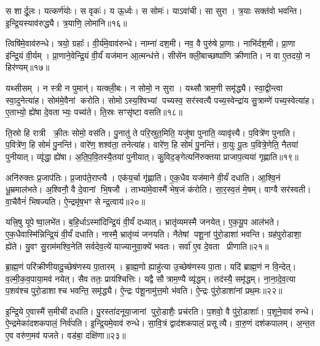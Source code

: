 स शार्दू॒लः।
यत्कर्ण॑योः।
स वृकः॑।
य ऊ॒र्ध्वः।
स सोमः॑।
याऽवा॑ची।
सा सुरा।
त्र॒याः सक्त॑वो भवन्ति।
इ॒न्द्रि॒यस्याव॑रुद्ध्यै।
त्र॒याणि॒ लोमा॑नि॥१६॥

त्विषि॑मे॒वाव॑रुन्धे।
त्रयो॒ ग्रहाः᳚।
वी॒र्य॑मे॒वाव॑रुन्धे।
नाम्ना॑ दश॒मी।
नव॒ वै पुरु॑षे प्रा॒णाः।
नाभि॑र्दश॒मी।
प्रा॒णा इ॑न्द्रि॒यं वी॒र्यम्।
प्रा॒णाने॒वेन्द्रि॒यं वी॒र्यं॑ यज॑मान आ॒त्मन्ध॑त्ते।
सीसे॑न क्ली॒बाच्छष्पा॑णि क्रीणाति।
न वा ए॒तदयो॒ न हिर॑ण्यम्॥१७॥

यथ्सीसम्।
न स्त्री न पुमान्॑।
यत्क्ली॒बः।
न सोमो॒ न सुरा।
यथ्सौत्राम॒णी समृ॑द्ध्यै।
स्वा॒द्वीन्त्वा स्वा॒दुनेत्या॑ह।
सोम॑मे॒वैनां करोति।
सोमो\-ऽस्य॒श्विभ्यां पच्यस्व॒ सर॑स्वत्यै पच्य॒स्वेन्द्रा॑य सु॒त्राम्णे॑ पच्य॒स्वेत्या॑ह।
ए॒ताभ्यो॒ ह्ये॑षा दे॒वताभ्यः॒ पच्य॑ते।
ति॒स्रः सꣳसृ॑ष्टा वसति॥१८॥

ति॒स्रो हि रात्री क्री॒तः सोमो॒ वस॑ति।
पु॒नातु॑ ते परि॒स्रुत॒मिति॒ यजु॑षा पुनाति॒ व्यावृ॑त्त्यै।
प॒वित्रे॑ण पुनाति।
प॒वित्रे॑ण॒ हि सोमं॑ पु॒नन्ति॑।
वारे॑ण॒ शश्व॑ता॒ तनेत्या॑ह।
वारे॑ण॒ हि सोमं॑ पु॒नन्ति॑।
वा॒युः पू॒तः प॒वित्रे॒णेति॒ नैतया॑ पुनीयात्।
व्यृ॑द्धा॒ ह्ये॑षा।
अ॒ति॒प॒वि॒तस्यै॒तया॑ पुनीयात्।
कु॒विद॒ङ्गेत्यनि॑रुक्तया प्राजाप॒त्यया॑ गृह्णाति॥१९॥

अनि॑रुक्तः प्र॒जाप॑तिः।
प्र॒जाप॑ते॒राप्त्यै।
एक॑य॒र्चा गृ॑ह्णाति।
ए॒क॒धैव यज॑माने वी॒र्यं॑ दधाति।
आ॒श्वि॒नं धू॒म्रमाल॑भते।
अ॒श्विनौ॒ वै दे॒वानां भि॒षजौ।
ताभ्या॑मे॒वास्मै॑ भेष॒जं क॑रोति।
सा॒र॒स्व॒तं मे॒षम्।
वाग्वै सर॑स्वती।
वा॒चैवैनं॑ भिषज्यति।
ऐ॒न्द्रमृ॑ष॒भꣳ सेन्द्र॒त्वाय॑॥२०॥\anuvakamend[अक्ष्यो॒र्लोमा॑नि॒ हिर॑ण्यं वसति गृह्णाति भिषज्य॒त्येकं॑ च]

यत्त्रि॒षु यूपेष्वा॒लभे॑त।
ब॒हि॒र्धा\-ऽस्मा॑दिन्द्रि॒यं वी॒र्यं॑ दध्यात्।
भ्रातृ॑व्यमस्मै जनयेत्।
ए॒क॒यू॒प आल॑भते।
ए॒क॒धैवास्मि॑न्निन्द्रि॒यं वी॒र्यं॑ दधाति।
नास्मै॒ भ्रातृ॑व्यं जनयति।
नैतेषां पशू॒नां पु॑रो॒डाशा॑ भवन्ति।
ग्रह॑पुरोडाशा॒ ह्ये॑ते।
यु॒वꣳ सु॒राम॑मश्वि॒नेति॑ सर्वदेव॒त्ये॑ याज्यानुवा॒क्ये॑ भवतः।
सर्वा॑ ए॒व दे॒वता प्रीणाति॥२१॥

ब्रा॒ह्म॒णं परि॑क्रीणीयादु॒च्छेष॑णस्य पा॒तारम्।
ब्रा॒ह्म॒णो ह्याहु॑त्या उ॒च्छेष॑णस्य पा॒ता।
यदि॑ ब्राह्म॒णं न वि॒न्देत्।
व॒ल्मी॒क॒व॒पाया॒मव॑ नयेत्।
सैव ततः॒ प्राय॑श्चित्तिः।
यद्वै सौत्राम॒ण्यै व्यृ॑द्धम्।
तद॑स्यै॒ समृ॑द्धम्।
ना॒ना॒दे॒व॒त्या प॒शव॑श्च पुरो॒डाशाश्च भवन्ति॒ समृ॑द्ध्यै।
ऐ॒न्द्रः प॑शू॒नामु॑त्त॒मो भ॑वति।
ऐ॒न्द्रः पु॑रो॒डाशा॑नां प्रथ॒मः॥२२॥

इ॒न्द्रि॒ये ए॒वास्मै॑ स॒मीची॑ दधाति।
पु॒रस्ता॑दनूया॒जानां पुरो॒डाशैः॒ प्रच॑रति।
प॒शवो॒ वै पु॑रो॒डाशाः᳚।
प॒शूने॒वाव॑ रुन्धे।
ऐ॒न्द्रमेका॑दशकपालं॒ निर्व॑पति।
इ॒न्द्रि॒यमे॒वाव॑ रुन्धे।
सा॒वि॒त्रं द्वाद॑शकपालं॒ प्रसूत्यै।
वा॒रु॒णं दश॑कपालम्।
अ॒न्त॒त ए॒व वरु॑ण॒मव॑ यजते।
वड॑बा॒ दक्षि॑णा॥२३॥

